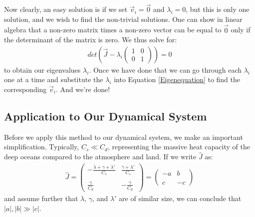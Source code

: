 Now clearly, an easy solution is if we set $\vec{v}_i=\vec{0}$ and $\lambda_i=0$, but this is only one solution, and we wish to find the non-trivial solutions. One can show in linear algebra that a non-zero matrix times a non-zero vector can be equal to $\vec{0}$ only if the determinant of the matrix is zero. We thus solve for:
\begin{align*}
    det\left( 
        \vec{J} - \lambda_i \left( \begin{array}{cc}
        1 & 0 \\
        0 & 1
    \end{array} \right)
    \right)=0
\end{align*}
to obtain our eigenvalues $\lambda_i$. Once we have done that we can go through each $\lambda_i$ one at a time and substitute the $\lambda_i$ into Equation \ref{Eigenequation} to find the corresponding $\vec{v}_i$. And we're done!

\subsection{Application to Our Dynamical System}\label{App to Dym}

Before we apply this method to our dynamical system, we make an important simplification. Typically, $C_s\ll C_d$, representing the massive heat capacity of the deep oceans compared to the atmosphere and land. If we write $\hat{J}$ as:
\begin{align*}
    \hat{J}=\left( \begin{array}{cc}
        -\frac{\lambda+\gamma+\lambda'}{C_s} & \frac{\gamma+\lambda'}{C_s} \\\\
        \frac{\gamma}{C_d} & -\frac{\gamma}{C_d}
    \end{array}
    \right)
    =\left( \begin{array}{cc}
        -a & b \\\\
        c & -c
    \end{array}
    \right)
\end{align*}
and assume further that $\lambda$, $\gamma$, and $\lambda'$ are of similar size, we can conclude that $|a|,|b|\gg |c|$. 


